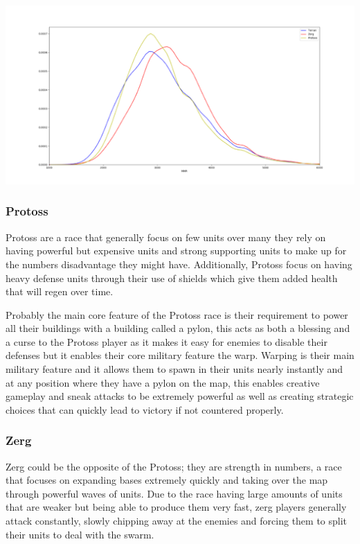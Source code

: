 \documentclass[a4paper,12pt]{report}
\begin{document}
\begin{center}
    \captionsetup{type=figure}
    \includegraphics[width=.5\linewidth]{media/MMRvsRace.png}
\end{center}

\subsubsection{Protoss}

Protoss are a race that generally focus on few units over many they rely on having powerful but expensive units and strong supporting units to make up for the numbers disadvantage they might have. Additionally, Protoss focus on having heavy defense units through their use of shields which give them added health that will regen over time.

Probably the main core feature of the Protoss race is their requirement to power all their buildings with a building called a pylon, this acts as both a blessing and a curse to the Protoss player as it makes it easy for enemies to disable their defenses but it enables their core military feature the warp. Warping is their main military feature and it allows them to spawn in their units nearly instantly and at any position where they have a pylon on the map, this enables creative gameplay and sneak attacks to be extremely powerful as well as creating strategic choices that can quickly lead to victory if not countered properly.

\subsubsection{Zerg}

Zerg could be the opposite of the Protoss; they are strength in numbers, a race that focuses on expanding bases extremely quickly and taking over the map through powerful waves of units. Due to the race having large amounts of units that are weaker but being able to produce them very fast, zerg players generally attack constantly, slowly chipping away at the enemies and forcing them to split their units to deal with the swarm.
\end{document}
